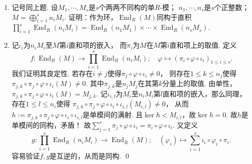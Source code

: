 \begin{enumerate}
\begin{equation*}
\begin{aligned}
        = \sum_{i,j=1}^{n}\iota_{i} \circ \pi_{i} \circ f \circ \iota_{j} \circ \pi_{j}
        = \sum_{j=1}^{n}f \circ \iota_{j} \circ \pi_{j} 
        = f,
        \end{aligned}\end{equation*}
        且
        \begin{equation*}\begin{aligned}
        \varphi \circ \psi([f_{ij}]) = f\bigg(\sum_{i,j=1}^{n}\iota_{i} \circ f_{ij} \circ \pi_{j}\bigg)
        = [\pi_{i} \circ \bigg(\sum_{k,l=1}^{n}\iota_{k} \circ f_{kl} \circ \pi_{l}\bigg) \circ \iota_{j}]
        = [f_{ij}].
        \end{aligned}\end{equation*}        
        这证明了$\psi \circ \varphi = \operatorname{id}_{\operatorname{End}(nM)}$以及
        $\varphi \circ \psi = \operatorname{id}_{M_{n}(A)}$. \qed

        \item[9.3] 记号同上题.
        设$M_{1},\cdots,M_{s}$是$s$个两两不同构的单$R$-模；
        $n_{1},\cdots,n_{s}$是$s$个正整数；
        $M = \bigoplus\limits_{i=1}^{s}n_{i}M_{i}$.
        证明：作为环，$\operatorname{End}_{R}(M)$同构于直积
        $\prod\limits_{i=1}^{s}\operatorname{End}_{R}(n_{i}M_{i})
        = \operatorname{End}_{R}(n_{1}M_{1}) \times \cdots 
        \times \operatorname{End}_{R}(n_{s}M_{s})$.
        \item[\textbf{证明:}]
        记$\iota_{i}$为$n_{i}M_{i}$至$M$第$i$直和项的嵌入，
        而$\pi_{i}$为$M$在$M$第$i$直和项上的取值. 
        定义\[f:\operatorname{End}_{R}(M) 
        \rightarrow \prod\limits_{i=1}^{s}\operatorname{End}_{R}(n_{i}M_{i});\quad
        \varphi \mapsto (\pi_{i} \circ \varphi \circ \iota_{i})_{1 \leq i \leq s}.\]
        我们证明其良定性.
        若存在$i \neq j$使得$\pi_{j} \circ \varphi \circ \iota_{i} \neq 0$，
        则存在$1 \leq k \leq n_{j}$使得
        $\pi_{j,k} \circ \pi_{j} \circ \varphi \circ \iota_{i}(M) \neq 0$.
        其中$\pi_{j,k}$是$n_{j}M_{j}$在其第$k$分量上的取值.
        由单性，$\pi_{j,k} \circ \pi_{j} \circ \varphi \circ \iota_{i}(M) = M_{j,k}$.
        记$\iota_{i,l}$为$M_{i}$至$n_{i}M_{i}$第$l$直和项的嵌入，那么同理，
        存在$1 \leq l \leq n_{i}$使得
        $\pi_{j,k} \circ \pi_{j} \circ \varphi \circ \iota_{i} \circ \iota_{i,l}(M_{i,l}) \neq 0$，
        从而$h := \pi_{j,k} \circ \pi_{j} \circ \varphi \circ \iota_{i} \circ \iota_{i,l}$是单模间的满射.
        且$\ker h < M_{i,l}$，故$\ker h = 0$.
        故$h$是单模间的同构，矛盾！
        故$\sum\limits_{j=1}^{s}\pi_{j} \circ \varphi \circ \iota_{i} 
        = \pi_{i} \circ \varphi \circ \iota_{i}$.
        又定义
        \[g:\prod\limits_{i=1}^{s}\operatorname{End}_{R}(n_{i}M_{i}) \rightarrow \operatorname{End}_{R}(M);\quad
        (\varphi_{i}) \mapsto \sum\limits_{i=1}^{s} \iota_{i} \circ \varphi_{i} \circ \pi_{i}.\]
        容易验证$f,g$是互逆的，从而是同构. \qed
    \end{enumerate}
